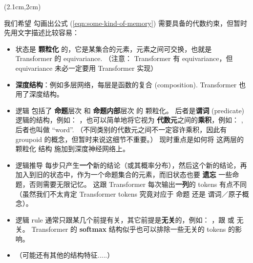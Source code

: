 \begin{preview}
\begin{minipage}{\textwidth}
	
\setlength{\parskip}{0.4\baselineskip}
\begin{textblock*}{20cm}(2.1cm,2cm) %
	{}
	\hspace{8cm}
\end{textblock*}
\vspace*{0.3cm} 

我们希望 勾画出公式 (\ref{eqn:some-kind-of-memory}) 需要具备的代数约束，但暂时先用文字描述比较容易：

\begin{itemize}
	\item 状态是 \textbf{颗粒化} 的，它是某集合的元素，元素之间可交换，也就是 Transformer 的 equivariance. （注意： Transformer 有 equivariance，但 equivariance 未必一定要用 Transformer 实现）

	\item \textbf{深度结构}：例如多层网络，每层是函数的复合 (composition). Transformer 也用了深度结构。
	
	\item 逻辑 包括了 \textbf{命题}层次 和 \textbf{命题内部}层次 的 颗粒化。 后者是\textbf{谓词} (predicate) 逻辑的结构，例如： ，也可以简单地将它视为 \textbf{代数元}之间的\textbf{乘积}，例如： , 后者也叫做 ``word''.  （不同类别的代数元之间不一定容许乘积，因此有 groupoid 的概念，但暂时来说这细节不重要。） 现时重点是如何将 这两层的 颗粒化 结构 施加到深度神经网络上。 

	\item 逻辑推导 每步只产生\textbf{一个}新的结论（或其概率分布），然后这个新的结论，再加入到旧的状态中，作为一个命题集合的元素，而旧状态也要 \textbf{遗忘} 一些命题，否则需要无限记忆。 这跟 Transformer 每次输出\textbf{一列}的 tokens 有点不同（虽然我们不太肯定 Transformer tokens 究竟对应于 命题 还是 谓词／原子概念）。 
	
	\item 逻辑 rule 通常只跟某几个前提有关，其它前提是\textbf{无关}的，例如： ，跟  或  无关。 Transformer 的 \textbf{softmax} 结构似乎也可以排除一些无关的 tokens 的影响。

	\item （可能还有其他的结构特征.....）
\end{itemize}

\end{minipage}
\end{preview}

